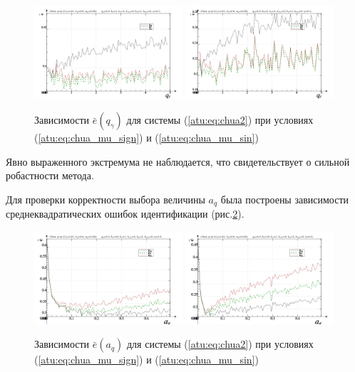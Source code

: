 \begin{figure}[htb!]
\centerline{
  \includegraphics[width=0.49\textwidth]{p/cha/chua/chua_m5p-p_qg_e_sign.png}
  \includegraphics[width=0.49\textwidth]{p/cha/chua/chua_m5p-p_qg_e_sin.png}
}
  \caption{Зависимости  $\bar{e}(q_\gamma)$ для системы (\ref{atu:eq:chua2})
  при условиях (\ref{atu:eq:chua_mu_sign}) и (\ref{atu:eq:chua_mu_sin})
}
\label{atu:f:chua_e_qgamma}
\end{figure}

Явно выраженного экстремума не наблюдается, что свидетельствует
о сильной робастности метода.

Для проверки корректности выбора величины $a_q$ была построены зависимости
среднеквадратических ошибок идентификации (рис.\ref{atu:f:chua_e_a_q}).


\begin{figure}[htb!]
\centerline{
  \includegraphics[width=0.49\textwidth]{p/cha/chua/chua_m5p-p_a_q_e_sign.png}
  \includegraphics[width=0.49\textwidth]{p/cha/chua/chua_m5p-p_a_q_e_sin.png}
}
  \caption{Зависимости  $\bar{e}(a_q)$ для системы (\ref{atu:eq:chua2})
  при условиях (\ref{atu:eq:chua_mu_sign}) и (\ref{atu:eq:chua_mu_sin})
}
\label{atu:f:chua_e_a_q}
\end{figure}

